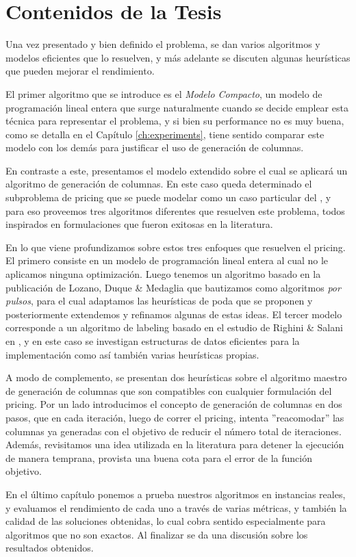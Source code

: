 \section{Contenidos de la Tesis}

Una vez presentado y bien definido el problema, se dan varios algoritmos y modelos eficientes que lo resuelven, y más adelante se discuten algunas heurísticas que pueden mejorar el rendimiento. 

El primer algoritmo que se introduce es el \emph{Modelo Compacto}, un modelo de programación lineal entera que surge naturalmente cuando se decide emplear esta técnica para representar el problema, y si bien su performance no es muy buena, como se detalla en el Capítulo \ref{ch:experiments}, tiene sentido comparar este modelo con los demás para justificar el uso de generación de columnas.

En contraste a este, presentamos el modelo extendido sobre el cual se aplicará un algoritmo de generación de columnas. En este caso queda determinado el subproblema de pricing que se puede modelar como un caso particular del , y para eso proveemos tres algoritmos diferentes que resuelven este problema, todos inspirados en formulaciones que fueron exitosas en la literatura. 

En lo que viene profundizamos sobre estos tres enfoques que resuelven el pricing. El primero consiste en un modelo de programación lineal entera al cual no le aplicamos ninguna optimización. Luego tenemos un algoritmo basado en la publicación de Lozano, Duque \& Medaglia \cite{lozano-duque-medaglia} que bautizamos como algoritmos \emph{por pulsos}, para el cual adaptamos las heurísticas de poda que se proponen y posteriormente extendemos y refinamos algunas de estas ideas. El tercer modelo corresponde a un algoritmo de labeling basado en el estudio de Righini \& Salani en \cite{righini-salani}, y en este caso se investigan estructuras de datos eficientes para la implementación como así también varias heurísticas propias. 

A modo de complemento, se presentan dos heurísticas sobre el algoritmo maestro de generación de columnas que son compatibles con cualquier formulación del pricing. Por un lado introducimos el concepto de generación de columnas en dos pasos, que en cada iteración, luego de correr el pricing, intenta ''reacomodar'' las columnas ya generadas con el objetivo de reducir el número total de iteraciones. Además, revisitamos una idea utilizada en la literatura para detener la ejecución de manera temprana, provista una buena cota para el error de la función objetivo.

En el último capítulo ponemos a prueba nuestros algoritmos en instancias reales, y evaluamos el rendimiento de cada uno a través de varias métricas, y también la calidad de las soluciones obtenidas, lo cual cobra sentido especialmente para algoritmos que no son exactos. Al finalizar se da una discusión sobre los resultados obtenidos.